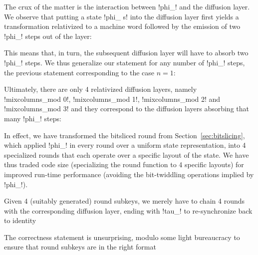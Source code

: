 \documentclass[draft,english]{jflart}
\begin{document}
The crux of the matter is the interaction between \coqe!phi_! and the
diffusion layer. We observe that putting a state \coqe!phi_ s! into
the diffusion layer first yields a transformation relativized to a
machine word followed by the emission of two \coqe!phi_! steps out of
the layer:
%
\begin{coro}
\end{coro}


This means that, in turn, the subsequent diffusion layer will have to
absorb two \coqe!phi_! steps. We thus generalize our statement for any
number of \coqe!phi_! steps, the previous statement corresponding to
the case $n = 1$:
%

Ultimately, there are only 4 relativized diffusion layers, namely
%
\coqe!mixcolumns_mod 0!,
%
\coqe!mixcolumns_mod 1!,
%
\coqe!mixcolumns_mod 2!
%
and
%
\coqe!mixcolumns_mod 3!
%
and they correspond to the diffusion layers absorbing that many
\coqe!phi_! steps:
%
\begin{prop}
\end{prop}

In effect, we have transformed the bitsliced round from
Section~\ref{sec:bitslicing}, which applied \coqe!phi_! in every round
over a uniform state representation, into 4 specialized rounds that
each operate over a specific layout of the state. We have thus traded
code size (specializing the round function to 4 specific layouts) for
improved run-time performance (avoiding the bit-twiddling operations
implied by \coqe!phi_!).



Given 4 (suitably generated) round subkeys, we merely have to chain 4
rounds with the corresponding diffusion layer, ending with \coqe!tau_!
to re-synchronize back to identity
%


The correctness statement is unsurprising, modulo some light
bureaucracy to ensure that round subkeys are in the right format
%
\begin{theo}
\end{theo}
\end{document}
